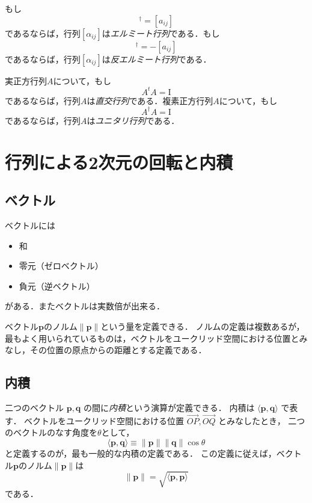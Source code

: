 \documentclass{jsbook}
\newcommand{\keyword}[1]{\emph{#1}}
\newcommand{\One}{\mathrm{I}}%
\newcommand{\norm}[1]{\|{#1}\|}
\newcommand{\bvec}[1]{\boldsymbol{#1}}
\begin{document}
もし
\begin{equation}
[a_{ij}]^\dagger=[a_{ij}]
\end{equation}
であるならば，行列$[\alpha_{ij}]$は\keyword{エルミート行列}である．もし
\begin{equation}
[a_{ij}]^\dagger=-[a_{ij}]
\end{equation}
であるならば，行列$[\alpha_{ij}]$は\keyword{反エルミート行列}である．

実正方行列$A$について，もし
\begin{equation}
A^tA=\One
\end{equation}
であるならば，行列$A$は\keyword{直交行列}である．複素正方行列$A$について，もし
\begin{equation}
A^\dagger A=\One
\end{equation}
であるならば，行列$A$は\keyword{ユニタリ行列}である．


\section{行列による2次元の回転と内積}

\subsection{ベクトル}

ベクトルには
\begin{itemize}
\item 和
\item 零元（ゼロベクトル）
\item 負元（逆ベクトル）
\end{itemize}
がある．またベクトルは実数倍が出来る．

ベクトル$\bvec{p}$のノルム$\norm{\bvec{p}}$という量を定義できる．
ノルムの定義は複数あるが，最もよく用いられているものは，ベクトルをユークリッド空間における位置とみなし，その位置の原点からの距離とする定義である．

\subsection{内積}

二つのベクトル $\bvec{p},\bvec{q}$ の間に\keyword{内積}という演算が定義できる．
内積は $\langle\bvec{p},\bvec{q}\rangle$ で表す．
ベクトルをユークリッド空間における位置 $\overrightarrow{OP},\overrightarrow{OQ}$ とみなしたとき，
二つのベクトルのなす角度を$\theta$として，
\begin{equation}
\langle\bvec{p},\bvec{q}\rangle\equiv\norm{\bvec{p}}\norm{\bvec{q}}\cos\theta
\end{equation}
と定義するのが，最も一般的な内積の定義である．
この定義に従えば，ベクトル$\bvec{p}$のノルム$\norm{\bvec{p}}$は
\begin{equation}
\norm{\bvec{p}}=\sqrt{\langle\bvec{p},\bvec{p}\rangle}
\end{equation}
である．
\end{document}
